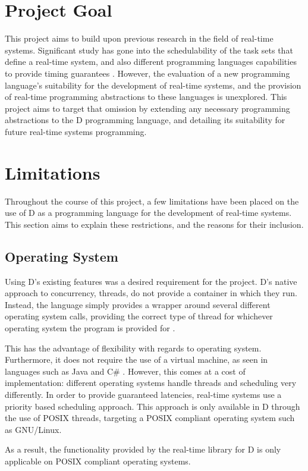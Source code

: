 \section{Project Goal} %
This project aims to build upon previous research in the field of real-time systems. 
Significant study has gone into the schedulability of the task sets that 
define a real-time system, and also different programming languages capabilities 
to provide timing guarantees \cite{burns-sched-analysis,atc-article}. 
However, the evaluation of a new programming language's suitability for the 
development of real-time systems, and the provision of real-time programming 
abstractions to these languages is unexplored. This project aims to target that 
omission by extending any necessary programming abstractions to the D programming 
language, and detailing its suitability for future real-time systems programming.
\section{Limitations} %
Throughout the course of this project, a few limitations have been placed on the 
use of D as a programming language for the development of real-time systems. 
This section aims to explain these restrictions, and the reasons for
their inclusion.
\subsection{Operating System}
Using D's existing features was a desired requirement for the project. D's native 
approach to concurrency, threads, do not provide a container in which they run. 
Instead, the language simply provides a wrapper around several different operating 
system calls, providing the correct type of thread for whichever operating system 
the program is provided for \cite{github-core-thread}. 
\par\bigskip\noindent
This has the advantage of flexibility with regards to operating system.
Furthermore, it does not require the use of a virtual machine, as seen in languages such as 
Java and C\# \cite{zhang2007exploiting}. However, this comes at a cost of implementation: 
different operating systems handle threads and scheduling very differently. 
In order to provide guaranteed latencies, real-time systems use a priority based 
scheduling approach. This approach is only available in D through the use of 
POSIX threads, targeting a POSIX compliant operating system such as GNU/Linux. 
\par\bigskip\noindent
As a result, the functionality provided by the real-time library for D is only 
applicable on POSIX compliant operating systems.


